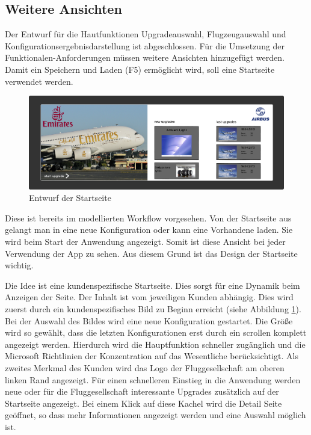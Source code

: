 \subsection{Weitere Ansichten}
Der Entwurf für die Hautfunktionen Upgradeauswahl, Flugzeugauswahl und Konfigurationsergebnisdarstellung ist abgeschlossen. Für die Umsetzung der Funktionalen-Anforderungen müssen weitere Ansichten hinzugefügt werden. Damit ein Speichern und Laden (F5) ermöglicht wird, soll eine Startseite verwendet werden. \par 
\begin{figure}
\centering
\includegraphics[width=\hsize]{images/start_entwurf}
\caption{Entwurf der Startseite}
\label{startSketch}
\end{figure}
Diese ist bereits im modellierten Workflow vorgesehen. Von der Startseite aus gelangt man in eine neue Konfiguration oder kann eine Vorhandene laden. Sie wird beim Start der Anwendung angezeigt. Somit ist diese Ansicht bei jeder Verwendung der App zu sehen. Aus diesem Grund ist das Design der Startseite wichtig. \par

 Die Idee ist eine kundenspezifische Startseite. Dies sorgt für eine Dynamik beim Anzeigen der Seite. Der Inhalt ist vom jeweiligen Kunden abhängig. Dies wird zuerst durch ein kundenspezifisches Bild zu Beginn erreicht (siehe Abbildung \ref{startSketch}). Bei der Auswahl des Bildes wird eine neue Konfiguration gestartet. Die Größe wird so gewählt, dass die letzten Konfigurationen erst durch ein scrollen komplett angezeigt werden. Hierdurch wird die Hauptfunktion schneller zugänglich und  die Microsoft Richtlinien der Konzentration auf das Wesentliche berücksichtigt. Als zweites Merkmal des Kunden wird das Logo der Fluggesellschaft am oberen linken Rand angezeigt. Für einen schnelleren Einstieg in die Anwendung werden neue oder für die Fluggesellschaft interessante Upgrades zusätzlich auf der Startseite angezeigt. Bei einem Klick auf diese Kachel wird die Detail Seite geöffnet, so dass mehr Informationen angezeigt werden und eine Auswahl möglich ist. 
\par 

